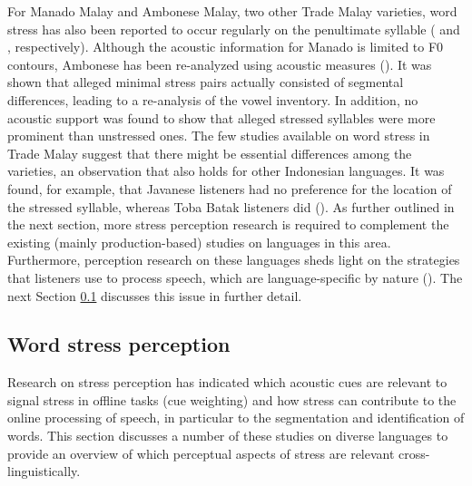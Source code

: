 For Manado Malay and Ambonese Malay, two other Trade Malay varieties, word stress has also been reported to occur regularly on the penultimate syllable (\citealt{stoel_intonation_2007} and \citealt{vanminde_malayu_1997}, respectively). Although the acoustic information for Manado is limited to F0 contours, Ambonese has been re-analyzed using acoustic measures (\citealt{maskikit-essed_no_2016}). It was shown that alleged minimal stress pairs actually consisted of segmental differences, leading to a re-analysis of the vowel inventory. In addition, no acoustic support was found to show that alleged stressed syllables were more prominent than unstressed ones. The few studies available on word stress in Trade Malay suggest that there might be essential differences among the varieties, an observation that also holds for other Indonesian languages. It was found, for example, that Javanese listeners had no preference for the location of the stressed syllable, whereas Toba Batak listeners did (\citealt{goedemans_stress_2007}). As further outlined in the next section, more stress perception research is required to complement the existing (mainly production-based) studies on languages in this area. Furthermore, perception research on these languages sheds light on the strategies that listeners use to process speech, which are language-specific by nature (\citealt{cutler_native_2012}). The next Section \ref{sec312} discusses this issue in further detail.

\subsection{Word stress perception} \label{sec312}

Research on stress perception has indicated which acoustic cues are relevant to signal stress in offline tasks (cue weighting) and how stress can contribute to the online processing of speech, in particular to the segmentation and identification of words. This section discusses a number of these studies on diverse languages to provide an overview of which perceptual aspects of stress are relevant cross-linguistically.

